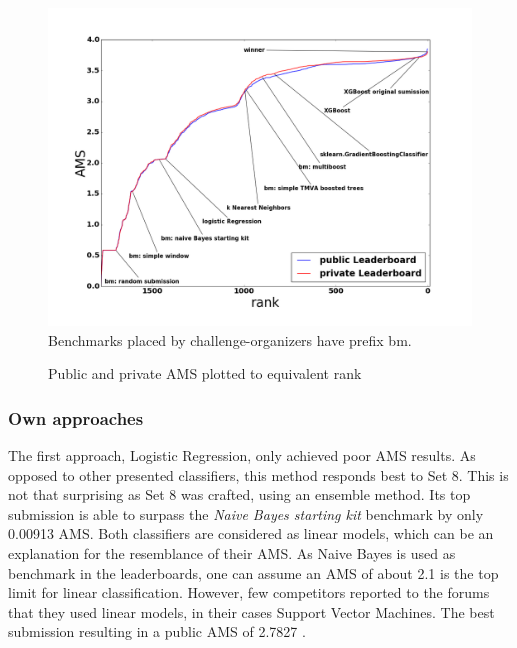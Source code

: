 \begin{figure}[h]
	\centering
	\includegraphics[width=\textwidth]{images/amscompare}
	\\Benchmarks placed by challenge-organizers have prefix bm.
	\caption{Public and private AMS plotted to equivalent rank}
	\label{fig:ranks}
\end{figure}

\subsubsection{Own approaches}
The first approach, Logistic Regression, only achieved poor AMS results. As opposed to other presented classifiers, this method responds best to Set 8. This is not that surprising as Set 8 was crafted, using an ensemble method. Its top submission is able to surpass the \emph{Naive Bayes starting kit} benchmark by only 0.00913 AMS. Both classifiers are considered as linear models, which can be an explanation for the resemblance of their AMS. As Naive Bayes is used as benchmark in the leaderboards, one can assume an AMS of about 2.1 is the top limit for linear classification. However, few competitors reported to the forums that they used linear models, in their cases Support Vector Machines. The best submission resulting in a public AMS of 2.7827 \cite{kaggleForum3}.

